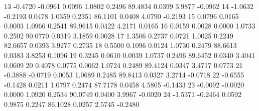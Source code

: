 \documentclass[
]{book}
\newenvironment{Shaded}{\begin{snugshade}}{\end{snugshade}}
\newcommand{\DecValTok}[1]{\textcolor[rgb]{0.00,0.00,0.81}{#1}}
\newcommand{\FloatTok}[1]{\textcolor[rgb]{0.00,0.00,0.81}{#1}}
\newcommand{\SpecialCharTok}[1]{\textcolor[rgb]{0.81,0.36,0.00}{\textbf{#1}}}
\begin{document}
\begin{Shaded}
\begin{Highlighting}[]
\DecValTok{13}  \SpecialCharTok{{-}}\FloatTok{0.4720} \SpecialCharTok{{-}}\FloatTok{0.0961} \FloatTok{0.0096} \FloatTok{1.0802}   \FloatTok{0.2496} \FloatTok{89.4834} \FloatTok{0.0399} \FloatTok{3.9877} \SpecialCharTok{{-}}\FloatTok{0.0962}     
\DecValTok{14}  \SpecialCharTok{{-}}\FloatTok{1.0632} \SpecialCharTok{{-}}\FloatTok{0.2193} \FloatTok{0.0478} \FloatTok{1.0359}   \FloatTok{0.2351} \FloatTok{86.1101} \FloatTok{0.0408} \FloatTok{4.0790} \SpecialCharTok{{-}}\FloatTok{0.2193}     
\DecValTok{15}   \FloatTok{0.0796}  \FloatTok{0.0165} \FloatTok{0.0003} \FloatTok{1.0966}   \FloatTok{0.2541} \FloatTok{89.9615} \FloatTok{0.0422} \FloatTok{4.2171}  \FloatTok{0.0165}     
\DecValTok{16}   \FloatTok{0.0159}  \FloatTok{0.0028} \FloatTok{0.0000} \FloatTok{1.0733}   \FloatTok{0.2502} \FloatTok{90.0770} \FloatTok{0.0319} \FloatTok{3.1859}  \FloatTok{0.0028}     
\DecValTok{17}   \FloatTok{1.3506}  \FloatTok{0.2737} \FloatTok{0.0721} \FloatTok{1.0025}   \FloatTok{0.2249} \FloatTok{82.6657} \FloatTok{0.0393} \FloatTok{3.9277}  \FloatTok{0.2735}     
\DecValTok{18}   \FloatTok{0.5500}  \FloatTok{0.1096} \FloatTok{0.0124} \FloatTok{1.0730}   \FloatTok{0.2479} \FloatTok{88.6613} \FloatTok{0.0383} \FloatTok{3.8253}  \FloatTok{0.1096}     
\DecValTok{19}   \FloatTok{0.3245}  \FloatTok{0.0610} \FloatTok{0.0039} \FloatTok{1.0737}   \FloatTok{0.2496} \FloatTok{89.6452} \FloatTok{0.0340} \FloatTok{3.4041}  \FloatTok{0.0609}     
\DecValTok{20}   \FloatTok{0.4078}  \FloatTok{0.0775} \FloatTok{0.0062} \FloatTok{1.0724}   \FloatTok{0.2489} \FloatTok{89.4124} \FloatTok{0.0347} \FloatTok{3.4717}  \FloatTok{0.0773}     
\DecValTok{21}  \SpecialCharTok{{-}}\FloatTok{0.3888} \SpecialCharTok{{-}}\FloatTok{0.0719} \FloatTok{0.0053} \FloatTok{1.0689}   \FloatTok{0.2485} \FloatTok{89.8413} \FloatTok{0.0327} \FloatTok{3.2714} \SpecialCharTok{{-}}\FloatTok{0.0718}     
\DecValTok{22}  \SpecialCharTok{{-}}\FloatTok{0.6555} \SpecialCharTok{{-}}\FloatTok{0.1428} \FloatTok{0.0211} \FloatTok{1.0797}   \FloatTok{0.2474} \FloatTok{87.7178} \FloatTok{0.0458} \FloatTok{4.5805} \SpecialCharTok{{-}}\FloatTok{0.1433}     
\DecValTok{23}  \SpecialCharTok{{-}}\FloatTok{0.0092} \SpecialCharTok{{-}}\FloatTok{0.0020} \FloatTok{0.0000} \FloatTok{1.0920}   \FloatTok{0.2534} \FloatTok{90.0749} \FloatTok{0.0400} \FloatTok{3.9967} \SpecialCharTok{{-}}\FloatTok{0.0020}     
\DecValTok{24}  \SpecialCharTok{{-}}\FloatTok{1.5371} \SpecialCharTok{{-}}\FloatTok{0.2464} \FloatTok{0.0592} \FloatTok{0.9875}   \FloatTok{0.2247} \FloatTok{86.1028} \FloatTok{0.0257} \FloatTok{2.5745} \SpecialCharTok{{-}}\FloatTok{0.2480}     

\end{Highlighting}
\end{Shaded}
\end{document}
